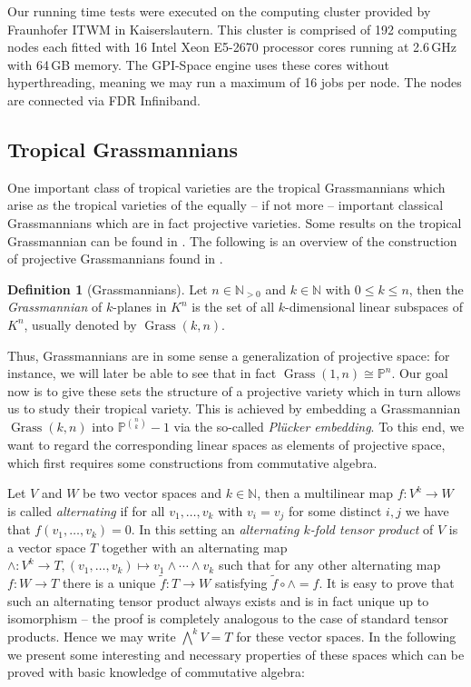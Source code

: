 \documentclass[
  paper=a4,
  titlepage,
  bibliography=totoc,
  pagesize=pdftex
]{scrartcl}
\numberwithin{figure}{section}
\numberwithin{equation}{section}
\numberwithin{table}{section}
\newcommand*\setN{\mathds{N}}
\newcommand*\setP{\mathds{P}}
\DeclareMathOperator{\Grass}{Grass}
\theoremstyle{definition}
\newtheorem{definition}{Definition}
\numberwithin{definition}{section}
\begin{document}
Our running time tests were executed on the computing cluster provided by Fraunhofer ITWM
in Kaiserslautern. This cluster is comprised of 192 computing nodes each fitted with 16
Intel Xeon E5-2670 processor cores running at 2.6\,GHz with 64\,GB memory. The GPI-Space
engine uses these cores without hyperthreading, meaning we may run a maximum of 16 jobs
per node. The nodes are connected via FDR Infiniband.

\subsection{Tropical Grassmannians}
\label{sec:grass}

One important class of tropical varieties are the tropical Grassmannians which arise as
the tropical varieties of the equally -- if not more -- important classical Grassmannians
which are in fact projective varieties. Some results on the tropical Grassmannian can be
found in \cite{tropGrass}. The following is an overview of the construction of projective
Grassmannians found in \cite[Section~8]{gathmAlgGeo}.

\begin{definition}[Grassmannians]
  Let $n \in \setN_{>0}$ and $k \in \setN$ with $0 \leq k \leq n$, then the
  \emph{Grassmannian} of $k$-planes in $K^n$ is the set of all $k$-dimensional linear
  subspaces of $K^n$, usually denoted by $\Grass(k, n)$.
\end{definition}

Thus, Grassmannians are in some sense a generalization of projective space: for instance,
we will later be able to see that in fact $\Grass(1,n) \cong \setP^n$. Our goal now is to
give these sets the structure of a projective variety which in turn allows us to study
their tropical variety. This is achieved by embedding a Grassmannian $\Grass(k, n)$ into
$\setP^{\binom nk}-1$ via the so-called \emph{Plücker embedding}. To this end, we want to
regard the corresponding linear spaces as elements of projective space, which first
requires some constructions from commutative algebra.

Let $V$ and $W$ be two vector spaces and $k\in\setN$, then a multilinear map $f : V^k \to
W$ is called \emph{alternating} if for all $v_1, \dots, v_k$ with $v_i=v_j$ for some
distinct $i,j$ we have that $f(v_1, \dots, v_k) = 0$. In this setting an \emph{alternating
$k$-fold tensor product} of $V$ is a vector space $T$ together with an alternating map
$\wedge:V^k\to T, (v_1, \dots, v_k) \mapsto v_1\wedge\cdots\wedge v_k$ such that for any
other alternating map $f:W\to T$ there is a unique $\tilde f:T\to W$ satisfying $\tilde f
\circ \wedge = f$. It is easy to prove that such an alternating tensor product always
exists and is in fact unique up to isomorphism -- the proof is completely analogous to the
case of standard tensor products. Hence we may write $\bigwedge^k V = T$ for these vector
spaces. In the following we present some interesting and necessary properties of these
spaces which can be proved with basic knowledge of commutative algebra:
\end{document}
